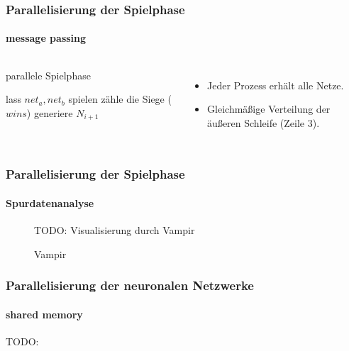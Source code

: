 \begin{frame}
    \frametitle{Parallelisierung der Spielphase}
    \framesubtitle{message passing}

    \begin{columns}
        \begin{algorithm}[H]
            \caption{parallele Spielphase}
            \begin{algorithmic}[1]
                    \State {}
                            \State lass $net_a, net_b$ spielen
                            \State zähle die Siege ($wins$)
                        \EndFor
                    \EndParDo
                    \State {}
                        generiere $N_{i+1}$
                    \EndIIf
                \EndFor
            \end{algorithmic}
        \end{algorithm}

        \begin{itemize}
            \item Jeder Prozess erhält alle Netze.
            \item Gleichmäßige Verteilung der äußeren Schleife (Zeile 3).
        \end{itemize}
    \end{columns}
\end{frame}

\begin{frame}
    \frametitle{Parallelisierung der Spielphase}
    \framesubtitle{Spurdatenanalyse}

    \begin{figure}
        \centering
        TODO: Visualisierung durch Vampir
        \caption{Vampir}
    \end{figure}

\end{frame}

\begin{frame}
    \frametitle{Parallelisierung der neuronalen Netzwerke}
    \framesubtitle{shared memory}

    TODO:
\end{frame}
